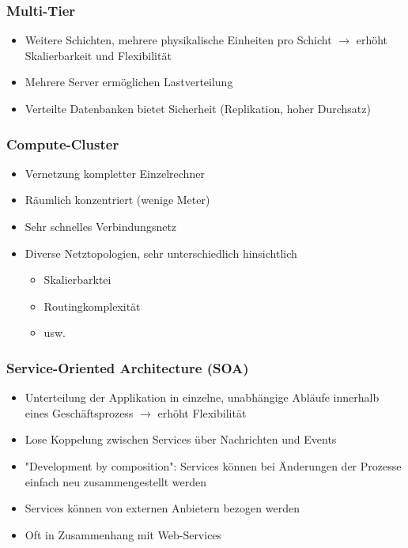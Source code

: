 \documentclass[10pt,a4paper]{article}
\begin{document}
\subsubsection{Multi-Tier}
\begin{itemize}
\item Weitere Schichten, mehrere physikalische Einheiten pro Schicht $\rightarrow$ erhöht Skalierbarkeit und Flexibilität
\item Mehrere Server ermöglichen Lastverteilung
\item Verteilte Datenbanken bietet Sicherheit (Replikation, hoher Durchsatz)
\end{itemize}

\subsubsection{Compute-Cluster}
\begin{itemize}
\item Vernetzung kompletter Einzelrechner
\item Räumlich konzentriert (wenige Meter)
\item Sehr schnelles Verbindungsnetz
\item Diverse Netztopologien, sehr unterschiedlich hinsichtlich
\begin{itemize}
\item Skalierbarktei
\item Routingkomplexität
\item usw.
\end{itemize}
\end{itemize}

\subsubsection{Service-Oriented Architecture (SOA)}
\begin{itemize}
\item Unterteilung der Applikation in einzelne, unabhängige Abläufe innerhalb eines Geschäftsprozess $\rightarrow$ erhöht Flexibilität
\item Lose Koppelung zwischen Services über Nachrichten und Events
\item "Development by composition": Services können bei Änderungen der Prozesse einfach neu zusammengestellt werden
\item Services können von externen Anbietern bezogen werden
\item Oft in Zusammenhang mit Web-Services
\end{itemize}
\end{document}
